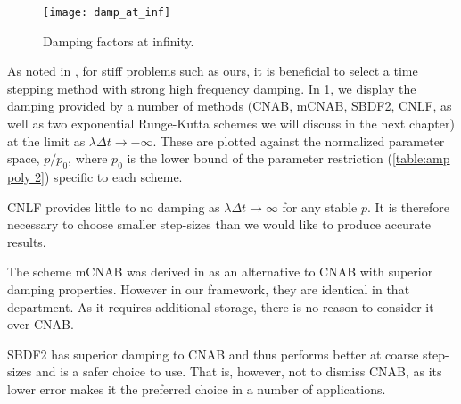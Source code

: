 \begin{figure}[htb!]
	\centering 
\texttt{[image: damp\_at\_inf]}
\caption[Damping factors at infinity.]{Damping factors at infinity.}
\label{fig:damp fac at inf}
\end{figure}

As noted in \cite{ascher1995implicit}, for stiff problems such as ours, it is beneficial to select a time stepping method with strong high frequency damping. In \cref{fig:damp fac at inf}, we display the damping provided by a number of methods (CNAB, mCNAB, SBDF2, CNLF, as well as two exponential Runge-Kutta schemes we will discuss in the next chapter) at the limit as $\lambda\Delta t \to -\infty$. These are plotted against the normalized parameter space, $p/p_0$, where $p_0$ is the lower bound of the parameter restriction (\cref{table:amp poly 2}) specific to each scheme. 

CNLF provides little to no damping as $\lambda\Delta t \to \infty$ for any stable $p$. It is therefore necessary to choose smaller step-sizes than we would like to produce accurate results. 

The scheme mCNAB was derived in \cite{ascher1995implicit} as an alternative to CNAB with superior damping properties. However in our framework, they are identical in that department. As it requires additional storage, there is no reason to consider it over CNAB.

SBDF2 has superior damping to CNAB and thus performs better at coarse step-sizes and is a safer choice to use. That is, however, not to dismiss CNAB, as its lower error makes it the preferred choice in a number of applications.



